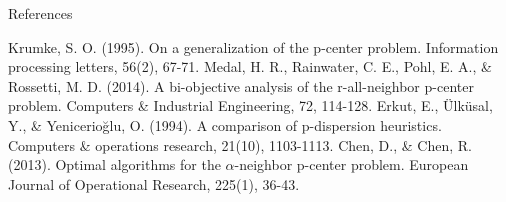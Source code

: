\documentclass{beamer}
\begin{document}
\begin{frame}{References}
    \begin{thebibliography}{10}
         Krumke, S. O. (1995). On a generalization of the p-center problem. Information processing letters, 56(2), 67-71.
         Medal, H. R., Rainwater, C. E., Pohl, E. A., \& Rossetti, M. D. (2014). A bi-objective analysis of the r-all-neighbor p-center problem. Computers \& Industrial Engineering, 72, 114-128.
         Erkut, E., Ülküsal, Y., \& Yenicerioğlu, O. (1994). A comparison of p-dispersion heuristics. Computers \& operations research, 21(10), 1103-1113.
         Chen, D., \& Chen, R. (2013). Optimal algorithms for the $\alpha$-neighbor p-center problem. European Journal of Operational Research, 225(1), 36-43.
    \end{thebibliography}
\end{frame}
\end{document}
